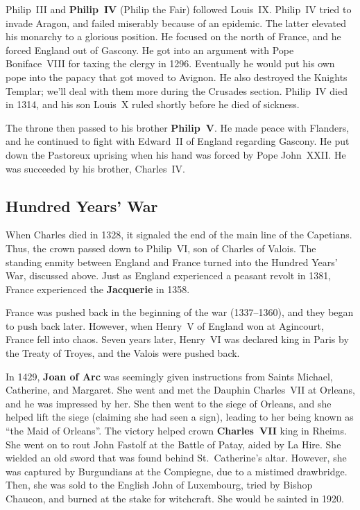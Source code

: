 Philip~III and \textbf{Philip~IV} (Philip the Fair) followed Louis~IX\@.
Philip~IV tried to invade Aragon, and failed miserably because of an epidemic.
The latter elevated his monarchy to a glorious position.
He focused on the north of France, and he forced England out of Gascony.
He got into an argument with Pope Boniface~VIII for taxing the clergy in 1296.
Eventually he would put his own pope into the papacy that got moved to Avignon.
He also destroyed the Knights Templar; we'll deal with them more during the Crusades section.
Philip~IV died in 1314, and his son Louis~X ruled shortly before he died of sickness.

The throne then passed to his brother \textbf{Philip~V}.
He made peace with Flanders, and he continued to fight with Edward~II of England regarding Gascony.
He put down the Pastoreux uprising when his hand was forced by Pope John~XXII\@.
He was succeeded by his brother, Charles~IV\@.

\subsection*{Hundred Years' War}

When Charles died in 1328, it signaled the end of the main line of the Capetians.
Thus, the crown passed down to Philip~VI, son of Charles of Valois.
The standing enmity between England and France turned into the Hundred Years' War, discussed above.
Just as England experienced a peasant revolt in 1381, France experienced the \textbf{Jacquerie} in 1358.

France was pushed back in the beginning of the war (1337--1360), and they began to push back later.
However, when Henry~V of England won at Agincourt, France fell into chaos.
Seven years later, Henry~VI was declared king in Paris by the Treaty of Troyes, and the Valois were pushed back.

In 1429, \textbf{Joan of Arc} was seemingly given instructions from Saints Michael, Catherine, and Margaret.
She went and met the Dauphin Charles~VII at Orleans, and he was impressed by her.
She then went to the siege of Orleans, and she helped lift the siege (claiming she had seen a sign),
leading to her being known as ``the Maid of Orleans''.
The victory helped crown \textbf{Charles~VII} king in Rheims.
She went on to rout John Fastolf at the Battle of Patay, aided by La Hire.
She wielded an old sword that was found behind St.\ Catherine's altar.
However, she was captured by Burgundians at the Compiegne, due to a mistimed drawbridge.
Then, she was sold to the English John of Luxembourg, tried by Bishop Chaucon, and burned at the stake for witchcraft.
She would be sainted in 1920.

